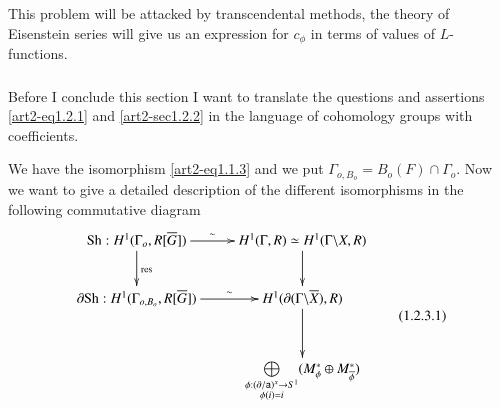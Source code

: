 This problem will be attacked by transcendental methods, the theory of Eisenstein series will give us an expression for $c_{\phi}$ in terms of values of $L$-functions.

\subsubsection{}\label{art2-sec1.2.3}
Before I conclude this section I want to translate the questions and assertions \ref{art2-eq1.2.1} and \ref{art2-sec1.2.2} in the language of cohomology groups with coefficients.

We have the isomorphism \eqref{art2-eq1.1.3} and we put $\Gamma_{o,B_{o}}=B_{o}(F)\cap \Gamma_{o}$. Now we want to give a detailed description of the different isomorphisms in the following commutative diagram
\begin{equation*}
\vcenter{\xymatrix{
\Sh : H^{1}(\Gamma_{o},R[\overline{G}])\ar[r]^-{\sim} \ar[d]^{\res} & H^{1}(\Gamma,R)\simeq H^{1}(\Gamma\backslash X,R)\ar[d]\\
\partial \Sh:H^{1}(\Gamma_{o,B_{o}},R[\overline{G}])\ar[r]^-{\sim} & H^{1}(\partial(\Gamma\backslash \overline{X}),R)\ar[d]\\
 & \bigoplus\limits_{\substack{\phi:(\partial/\sfa)^{x}\to S^{1}\\ \phi(i)=i}}(M^{*}_{\phi}\oplus M^{*}_{\overline{\phi}})
}}\tag{1.2.3.1}\label{art2-eq1.2.3.1}
\end{equation*}

